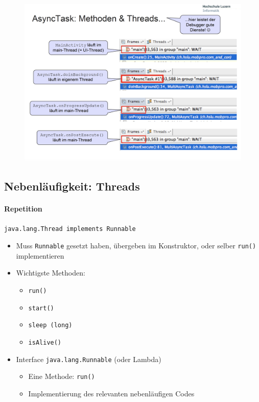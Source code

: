 \documentclass[a4paper]{article}
\begin{document}
		\begin{figure}[htb!]
			\centering
			\includegraphics[width=.9\textwidth]{img/async_demo_04.png}
		\end{figure}
	
	\newpage
	\subsection{Nebenläufigkeit: Threads}
		\paragraph{Repetition}
		\texttt{java.lang.Thread implements Runnable}
		\begin{itemize}
			\item Muss \texttt{Runnable} gesetzt haben, übergeben im Konstruktor, oder selber \texttt{run()} implementieren
			\item Wichtigste Methoden:
				\begin{itemize}
					\item \texttt{run()}
					\item \texttt{start()}
					\item \texttt{sleep (long)}
					\item \texttt{isAlive()}
				\end{itemize}
			\item Interface \texttt{java.lang.Runnable} (oder Lambda)
				\begin{itemize}
					\item Eine Methode: \texttt{run()}
					\item Implementierung des relevanten nebenläufigen Codes
				\end{itemize}
		\end{itemize}
	
\end{document}
